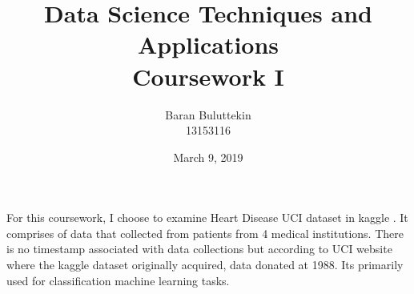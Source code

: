 \documentclass[12pt]{article}
\begin{document}
\author{Baran Buluttekin\\13153116}
\title{Data Science Techniques and Applications\\Coursework I}
\date{March 9, 2019}
\maketitle

\medskip

\indent For this coursework, I choose to examine Heart Disease UCI dataset \cite{uci-source} in kaggle \cite{kaggle}. It comprises of data that collected from patients from 4 medical institutions. There is no timestamp associated with data collections but according to UCI website where the kaggle dataset originally acquired, data donated at 1988. Its primarily used for classification machine learning tasks.
\end{document}
